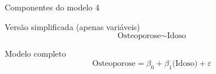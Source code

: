 \documentclass{beamer}
\begin{document}
\begin{frame}{\small Componentes do modelo 4}
  \begin{block}{\footnotesize Versão simplificada (apenas variáveis)}
    \footnotesize
    \begin{displaymath}
      \text{Osteoporose} \sim \text{Idoso}
    \end{displaymath}
  \end{block}
  \bigskip
  \bigskip
  \begin{block}{Modelo completo}
    \begin{displaymath}
      \text{Osteoporose} =\beta_0 + \beta_1 \text{(Idoso)} +\varepsilon
    \end{displaymath}
  \end{block}
  \vfill
\end{frame}
\end{document}
